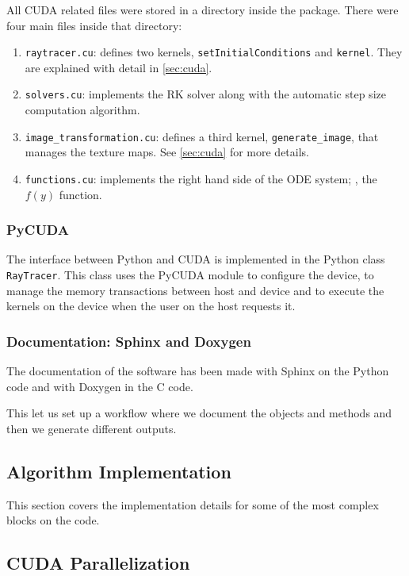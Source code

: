 All \ac{CUDA} related files were stored in a directory inside the package. There were four main files inside that directory:
\begin{enumerate}
	\item \lstinline{raytracer.cu}: defines two kernels, \lstinline{setInitialConditions} and \lstinline{kernel}. They are explained with detail in \autoref{sec:cuda}.
	\item \lstinline{solvers.cu}: implements the \ac{RK} solver along with the automatic step size computation algorithm.
	\item \lstinline{image_transformation.cu}: defines a third kernel, \lstinline{generate_image}, that manages the texture maps. See \autoref{sec:cuda} for more details.
	\item \lstinline{functions.cu}: implements the right hand side of the \ac{ODE} system; \ie, the $f(y)$ function.
\end{enumerate}

\subsubsection*{PyCUDA}

The interface between Python and \ac{CUDA} is implemented in the Python class \lstinline{RayTracer}. This class uses the PyCUDA module to configure the device, to manage the memory transactions between host and device and to execute the kernels on the device when the user on the host requests it.

\subsubsection*{Documentation: Sphinx and Doxygen}

The documentation of the software has been made with Sphinx on the Python code and with Doxygen in the C code.

This let us set up a workflow where we document the objects and methods and then we generate different outputs.

\subsection{Algorithm Implementation}

This section covers the implementation details for some of the most complex blocks on the code.

\subsection{CUDA Parallelization}
\label{sec:cuda}

